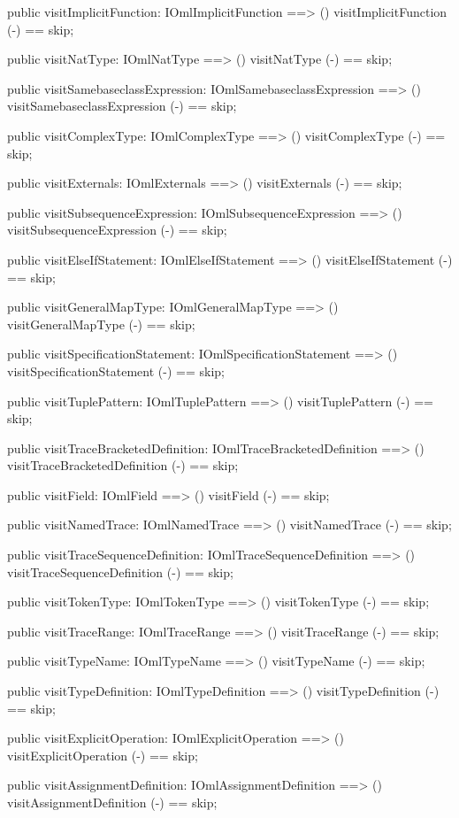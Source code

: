 \begin{vdm_al}
  public visitImplicitFunction: IOmlImplicitFunction ==> ()
  visitImplicitFunction (-) == skip;

  public visitNatType: IOmlNatType ==> ()
  visitNatType (-) == skip;

  public visitSamebaseclassExpression: IOmlSamebaseclassExpression ==> ()
  visitSamebaseclassExpression (-) == skip;

  public visitComplexType: IOmlComplexType ==> ()
  visitComplexType (-) == skip;

  public visitExternals: IOmlExternals ==> ()
  visitExternals (-) == skip;

  public visitSubsequenceExpression: IOmlSubsequenceExpression ==> ()
  visitSubsequenceExpression (-) == skip;

  public visitElseIfStatement: IOmlElseIfStatement ==> ()
  visitElseIfStatement (-) == skip;

  public visitGeneralMapType: IOmlGeneralMapType ==> ()
  visitGeneralMapType (-) == skip;

  public visitSpecificationStatement: IOmlSpecificationStatement ==> ()
  visitSpecificationStatement (-) == skip;

  public visitTuplePattern: IOmlTuplePattern ==> ()
  visitTuplePattern (-) == skip;

  public visitTraceBracketedDefinition: IOmlTraceBracketedDefinition ==> ()
  visitTraceBracketedDefinition (-) == skip;

  public visitField: IOmlField ==> ()
  visitField (-) == skip;

  public visitNamedTrace: IOmlNamedTrace ==> ()
  visitNamedTrace (-) == skip;

  public visitTraceSequenceDefinition: IOmlTraceSequenceDefinition ==> ()
  visitTraceSequenceDefinition (-) == skip;

  public visitTokenType: IOmlTokenType ==> ()
  visitTokenType (-) == skip;

  public visitTraceRange: IOmlTraceRange ==> ()
  visitTraceRange (-) == skip;

  public visitTypeName: IOmlTypeName ==> ()
  visitTypeName (-) == skip;

  public visitTypeDefinition: IOmlTypeDefinition ==> ()
  visitTypeDefinition (-) == skip;

  public visitExplicitOperation: IOmlExplicitOperation ==> ()
  visitExplicitOperation (-) == skip;

  public visitAssignmentDefinition: IOmlAssignmentDefinition ==> ()
  visitAssignmentDefinition (-) == skip;


\end{vdm_al}
